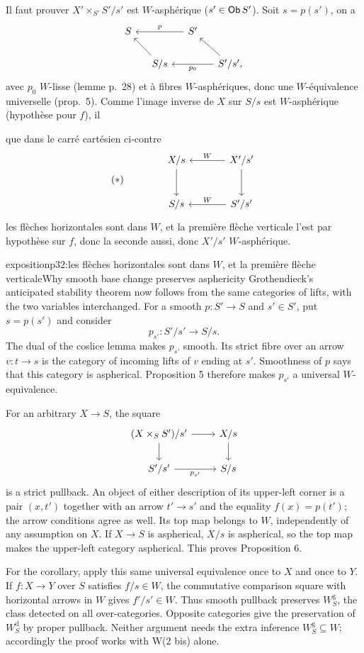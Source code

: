 Il faut prouver $X'\times_{S'}S'/s'$ est $W$-asphérique ($s'\in\mathsf{Ob}\,S'$). Soit $s=p(s')$, on a
\[
\begin{tikzcd}[column sep=small]
S & & S' \arrow[ll, "p"'] & \\
& S/s \arrow[ul] & & S'/s', \arrow[ul] \arrow[ll, "p_0"]
\end{tikzcd}
\]
avec $p_0$ $W$-lisse (lemme p.~28) et à fibres $W$-asphériques, donc une $W$-équivalence universelle (prop.~5). Comme l'image inverse de $X$ sur $S/s$ est $W$-asphérique (hypothèse pour $f$), il

\leavevmode{}que dans le carré cartésien ci-contre
\[
(*)\qquad\qquad
\begin{tikzcd}[row sep=large, column sep=large]
X/s \arrow[d] & X'/s' \arrow[l, "W"'] \arrow[d] \\
S/s & S'/s' \arrow[l, "W"']
\end{tikzcd}
\]
les flèches horizontales sont dans $W$, et la première flèche verticale l'est par hypothèse sur $f$, donc la seconde aussi, donc $X'/s'$ $W$-asphérique.

\begin{dcomment}{exposition}{p32:les flèches horizontales sont dans $W$, et la première flèche verticale}{Why smooth base change preserves asphericity}
Grothendieck's anticipated stability theorem now follows from the same categories of lifts, with the two variables interchanged. For a smooth $p:S'\to S$ and $s'\in S'$, put $s=p(s')$ and consider
\[
 p_{s'}:S'/s'\longrightarrow S/s.
\]
The dual of the coslice lemma makes $p_{s'}$ smooth. Its strict fibre over an arrow $v:t\to s$ is the category of incoming lifts of $v$ ending at $s'$. Smoothness of $p$ says that this category is aspherical. Proposition 5 therefore makes $p_{s'}$ a universal $W$-equivalence.

For an arbitrary $X\to S$, the square
\[
\begin{tikzcd}
 (X\times_S S')/s'\ar[r]\ar[d]&X/s\ar[d]\\
 S'/s'\ar[r,"p_{s'}"']&S/s
\end{tikzcd}
\]
is a strict pullback. An object of either description of its upper-left corner is a pair $(x,t')$ together with an arrow $t'\to s'$ and the equality $f(x)=p(t')$; the arrow conditions agree as well. Its top map belongs to $W$, independently of any assumption on $X$. If $X\to S$ is aspherical, $X/s$ is aspherical, so the top map makes the upper-left category aspherical. This proves Proposition 6.

For the corollary, apply this same universal equivalence once to $X$ and once to $Y$. If $f:X\to Y$ over $S$ satisfies $f/s\in W$, the commutative comparison square with horizontal arrows in $W$ gives $f'/s'\in W$. Thus smooth pullback preserves $W_S^{\mathrm g}$, the class detected on all over-categories. Opposite categories give the preservation of $W_S^{\mathrm d}$ by proper pullback. Neither argument needs the extra inference $W_S^{\mathrm g}\subseteq W$; accordingly the proof works with W(2 bis) alone.
\end{dcomment}


